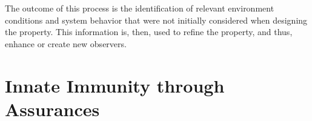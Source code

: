 The outcome of this process is the identification of relevant environment conditions and system behavior that were not initially considered when designing the property. This information is, then, used to refine the property, and thus, enhance or create new observers.


\section{Innate Immunity through Assurances}







